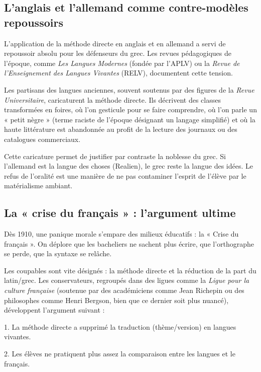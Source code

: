 \subsection{L'anglais et l'allemand comme contre-modèles repoussoirs}

L'application de la méthode directe en anglais et en allemand a servi de repoussoir absolu pour les
défenseurs du grec. Les revues pédagogiques de l'époque, comme \textit{Les Langues Modernes} (fondée
par l'APLV) ou la \textit{Revue de l'Enseignement des Langues Vivantes} (RELV), documentent cette
tension.\cite{I-2-2-ref6}

Les partisans des langues anciennes, souvent soutenus par des figures de la \textit{Revue
Universitaire}, caricaturent la méthode directe. Ils décrivent des classes transformées en foires,
où l'on gesticule pour se faire comprendre, où l'on parle un « petit nègre » (terme raciste de
l'époque désignant un langage simplifié) et où la haute littérature est abandonnée au profit de la
lecture des journaux ou des catalogues commerciaux.\cite{I-2-2-ref7}

Cette caricature permet de justifier par contraste la noblesse du grec. Si l'allemand est la langue
des \og choses\fg{} (Realien), le grec reste la langue des \og idées\fg{}. Le refus de l'oralité est
une manière de ne pas contaminer l'esprit de l'élève par le matérialisme ambiant.



\subsection{La « crise du français » : l'argument ultime}

Dès 1910, une panique morale s'empare des milieux éducatifs : la « Crise du français ». On déplore
que les bacheliers ne sachent plus écrire, que l'orthographe se perde, que la syntaxe se
relâche.\cite{I-2-2-ref24}

Les coupables sont vite désignés : la méthode directe et la réduction de la part du latin/grec. Les
conservateurs, regroupés dans des ligues comme la \textit{Ligue pour la culture française} (soutenue
par des académiciens comme Jean Richepin ou des philosophes comme Henri Bergson, bien que ce dernier
soit plus nuancé), développent l'argument suivant :

1. La méthode directe a supprimé la traduction (thème/version) en langues vivantes.

2. Les élèves ne pratiquent plus assez la comparaison entre les langues et le français.

